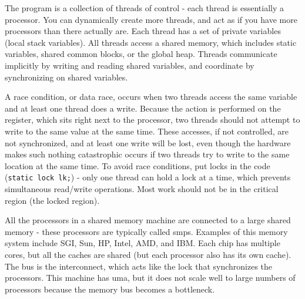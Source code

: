 \documentclass[10pt]{article}
\begin{document}
\begin{flushleft}
The program is a collection of threads of control - each thread is essentially a processor. You can dynamically create more threads, and act as if you have more processors than there actually are. Each thread has a set of private variables (local stack variables). All threads access a shared memory, which includes static variables, shared common blocks, or the global heap. Threads communicate implicitly by writing and reading shared variables, and coordinate by synchronizing on shared variables.

A race condition, or data race, occurs when two threads access the same variable and at least one thread does a write. Because the action is performed on the register, which sits right next to the processor, two threads should not attempt to write to the same value at the same time. These accesses, if not controlled, are not synchronized, and at least one write will be lost, even though the hardware makes such nothing catastrophic occurs if two threads try to write to the same location at the same time. To avoid race conditions, put locks in the code ({\tt static lock lk;}) - only one thread can hold a lock at a time, which prevents simultaneous read/write operations. Most work should not be in the critical region (the locked region).

All the processors in a shared memory machine are connected to a large shared memory - these processors are typically called \gls{smp}s. Examples of this memory system include SGI, Sun, HP, Intel, AMD, and IBM. Each chip has multiple cores, but all the caches are shared (but each processor also has its own cache). The bus is the interconnect, which acts like the lock that synchronizes the processors. This machine has \gls{uma}, but it does not scale well to large numbers of processors because the memory bus becomes a bottleneck.

\end{flushleft}
\end{document}

